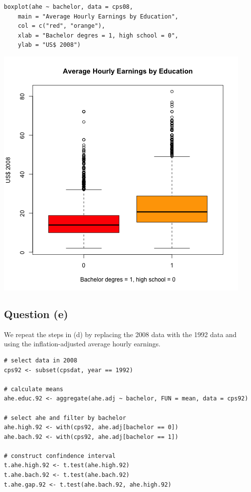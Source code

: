 \documentclass[a4paper,11pt]{article}
\begin{document}
\begin{verbatim}
boxplot(ahe ~ bachelor, data = cps08,
	main = "Average Hourly Earnings by Education",
	col = c("red", "orange"),
	xlab = "Bachelor degres = 1, high school = 0",
	ylab = "US$ 2008")
\end{verbatim}

\begin{center}
\includegraphics[width=.9\linewidth]{figure/boxplot.png}
\end{center}

\subsection*{Question (e)}
\label{sec:org9fb4fa2}

We repeat the steps in (d) by replacing the 2008 data with the 1992
data and using the inflation-adjusted average hourly earnings.

\begin{verbatim}
# select data in 2008
cps92 <- subset(cpsdat, year == 1992)

# calculate means
ahe.educ.92 <- aggregate(ahe.adj ~ bachelor, FUN = mean, data = cps92)

# select ahe and filter by bachelor
ahe.high.92 <- with(cps92, ahe.adj[bachelor == 0])
ahe.bach.92 <- with(cps92, ahe.adj[bachelor == 1])

# construct confindence interval
t.ahe.high.92 <- t.test(ahe.high.92)
t.ahe.bach.92 <- t.test(ahe.bach.92)
t.ahe.gap.92 <- t.test(ahe.bach.92, ahe.high.92)
\end{verbatim}
\end{document}
